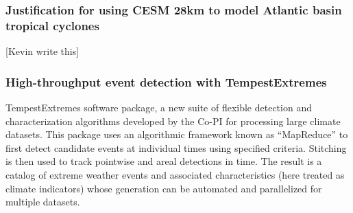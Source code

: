 \documentclass[11pt]{article}
\begin{document}
\subsubsection{Justification for using CESM 28km to model Atlantic basin tropical cyclones}

{\color{red}[Kevin write this]}

\subsubsection{High-throughput event detection with TempestExtremes} \label{sec:TempestExtremes}

TempestExtremes software package, a new suite of flexible detection and characterization algorithms developed by the Co-PI for processing large climate datasets. This package uses an algorithmic framework known as ``MapReduce'' to first detect candidate events at individual times using specified criteria. Stitching is then used to track pointwise and areal detections in time. The result is a catalog of extreme weather events and associated characteristics (here treated as climate indicators) whose generation can be automated and parallelized for multiple datasets.
\end{document}
